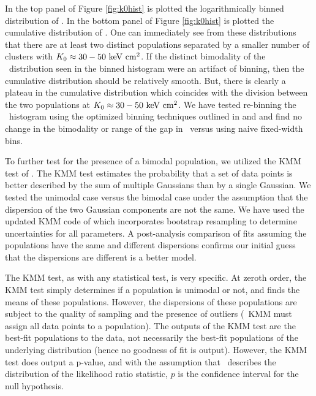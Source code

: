 \documentclass[12pt,preprint]{aastex}
\begin{document}
In the top panel of Figure \ref{fig:k0hist} is plotted the
logarithmically binned distribution of \kna. In the bottom panel of
Figure \ref{fig:k0hist} is plotted the cumulative distribution of
\kna. One can immediately see from these distributions that there are
at least two distinct populations separated by a smaller number of
clusters with $K_0 \approx 30-50 \mathrm{\mbox{\ensuremath{\mathrm{~keV}}} \mathrm{\mbox{\ensuremath{\mathrm{~cm}}}^2}}$. If the distinct bimodality of
the \kna\ distribution seen in the binned histogram were an artifact
of binning, then the cumulative distribution should be relatively
smooth. But, there is clearly a plateau in the cumulative distribution
which coincides with the division between the two populations at $K_0
\approx 30-50 \mathrm{\mbox{\ensuremath{\mathrm{~keV}}} \mathrm{\mbox{\ensuremath{\mathrm{~cm}}}^2}}$. We have tested re-binning the \kna\ histogram
using the optimized binning techniques outlined in \citet{knuthbin}
and \citet{2008arXiv0807.4820H} and find no change in the bimodality
or range of the gap in \kna\ versus using naive fixed-width bins.

To further test for the presence of a bimodal population, we utilized
the KMM test of \citet{kmm1}. The KMM test estimates the probability
that a set of data points is better described by the sum of multiple
Gaussians than by a single Gaussian. We tested the unimodal case
versus the bimodal case under the assumption that the dispersion of
the two Gaussian components are not the same. We have used the updated
KMM code of \citet{kmm2} which incorporates bootstrap resampling to
determine uncertainties for all parameters. A post-analysis comparison
of fits assuming the populations have the same and different
dispersions confirms our initial guess that the dispersions are
different is a better model.

The KMM test, as with any statistical test, is very specific. At
zeroth order, the KMM test simply determines if a population is
unimodal or not, and finds the means of these populations. However,
the dispersions of these populations are subject to the quality of
sampling and the presence of outliers (\eg\ KMM must assign all data
points to a population). The outputs of the KMM test are the best-fit
populations to the data, not necessarily the best-fit populations of
the underlying distribution (hence no goodness of fit is
output). However, the KMM test does output a p-value, and with the
assumption that \chisq\ describes the distribution of the likelihood
ratio statistic, $p$ is the confidence interval for the null
hypothesis.
\end{document}
